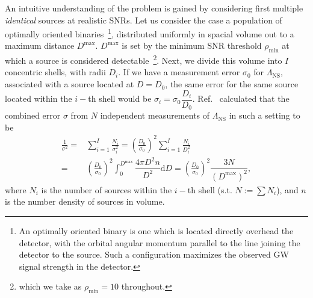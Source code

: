 \documentclass[aps,prd,amsmath,floats,floatfix, twocolumn,
superscriptaddress,nofootinbib,showpacs]{revtex4-1}
\newcommand{\prayush}{\textcolor{red!40!black}}
\newcommand{\D}{\mathrm{d}}
\newcommand{\lambdans}{\Lambda_\mathrm{NS}}
\newcommand{\deff}{D_\mathrm{eff}}
\begin{document}
% 
An intuitive understanding of the problem is gained by considering first
multiple {\it identical} sources at realistic SNRs. Let us consider the case
a population of optimally oriented binaries~\footnote{An optimally oriented
binary is one which is located directly overhead the detector, with the 
orbital angular momentum parallel to the line joining the detector to the
source. Such a configuration maximizes the observed GW signal strength in 
the detector.}, distributed uniformly in spacial volume out to a maximum
distance $D^\mathrm{max}$. $D^\mathrm{max}$ is set by the minimum SNR 
threshold $\rho_\mathrm{min}$ at which a source is considered
detectable~\footnote{which
we take as $\rho_\mathrm{min}=10$ throughout.}. Next, we divide this volume into $I$
concentric shells, with radii $D_i$. If we have a measurement error
$\sigma_0$ for $\lambdans$, associated with a source located at $D=D_0$,
the same error for the same source located within the $i-$th shell would
be $\sigma_i=\sigma_0 \dfrac{D_i}{D_0}$. Ref.~\cite{Markakis:2010mp}
calculated that the combined error $\sigma$ from $N$ independent
measurements of $\lambdans$ in such a setting to be
% 
\begin{align}\label{eq:1oversigma}
\frac{1}{\sigma^2} =& \sum_{i=1}^I \frac{N_i}{\sigma_i^2} = \left(\frac{D_0}{\sigma_0}\right)^2 \sum_{i=1}^I\frac{N_i}{D_i^2}\\ \nonumber =& \left(\frac{D_0}{\sigma_0}\right)^2 \int_0^{D^\mathrm{max}} \dfrac{4\pi D^2 n}{D^2}\D D = \left(\frac{D_0}{\sigma_0}\right)^2 \dfrac{3N}{(D^\mathrm{max})^2},
\end{align}
% 
where $N_i$ is the number of sources within the $i-$th shell (s.t.
$N:=\sum N_i$), and $n$ is the number density of sources in volume.
% 
% 
% 
% 
% 
\end{document}
